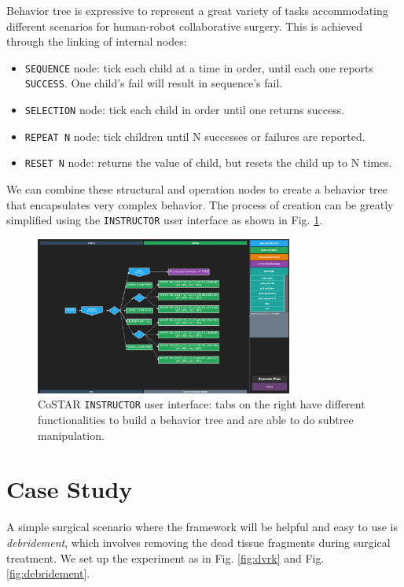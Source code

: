 \documentclass[letterpaper, 10 pt, conference]{ieeeconf}
\begin{document}
Behavior tree is expressive to represent a great variety of tasks accommodating different scenarios for human-robot collaborative surgery. This is achieved through the linking of internal nodes:
 
\begin{itemize}
\item \texttt{SEQUENCE} node: tick each child at a time in order, until each one reports \texttt{SUCCESS}. One child's fail will result in sequence's fail.
\item \texttt{SELECTION} node: tick each child in order until one returns success.
\item \texttt{REPEAT N} node: tick children until N successes or failures are reported.
\item \texttt{RESET N} node: returns the value of child, but resets the child up to N times.
\end{itemize} 

We can combine these structural and operation nodes to create a behavior tree that encapsulates very complex behavior. The process of creation can be greatly simplified using the \texttt{INSTRUCTOR} user interface as shown in Fig. \ref{fig:instructor}.

\begin{figure}[bt]
\centering
\includegraphics[width=240pt]{instructor2.png}
\caption{CoSTAR \texttt{INSTRUCTOR} user interface: tabs on the right have different functionalities to build a behavior tree and are able to do subtree manipulation. }
\label{fig:instructor}
\end{figure}


\section{Case Study}
A simple surgical scenario where the framework will be helpful and easy to use is \textit{debridement}, which involves removing the dead tissue fragments during surgical treatment. We set up the experiment \cite{video} as in Fig. \ref{fig:dvrk} and Fig. \ref{fig:debridement}. 
\end{document}
